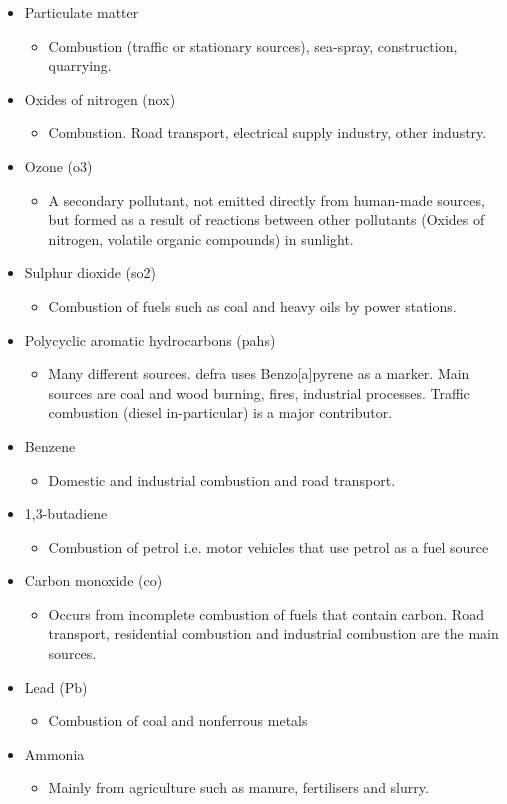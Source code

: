 \begin{itemize}
\item Particulate matter
\begin{itemize}
\item Combustion (traffic or stationary sources), sea-spray, construction, quarrying.
\end{itemize}
\item Oxides of nitrogen (\gls{nox})
\begin{itemize}
\item Combustion. Road transport, electrical supply industry, other industry.
\end{itemize}
\item Ozone (\gls{o3})
\begin{itemize}
\item A secondary pollutant, not emitted directly from human-made sources, but formed as a result of reactions between other pollutants (Oxides of nitrogen, volatile organic compounds) in sunlight.
\end{itemize}
\item Sulphur dioxide (\gls{so2})
\begin{itemize}
\item Combustion of fuels such as coal and heavy oils by power stations.
\end{itemize}
\item Polycyclic aromatic hydrocarbons (\gls{pahs}) 
\begin{itemize}
\item Many different sources. \gls{defra} uses Benzo[a]pyrene as a marker. Main sources are coal and wood burning, fires, industrial processes. Traffic combustion (diesel in-particular) is a major contributor.
\end{itemize}
\item Benzene
\begin{itemize}
\item Domestic and industrial combustion and road transport.
\end{itemize}
\item 1,3-butadiene
\begin{itemize}
\item Combustion of petrol i.e. motor vehicles that use petrol as a fuel source
\end{itemize}
\item Carbon monoxide (\gls{co})
\begin{itemize}
\item Occurs from incomplete combustion of fuels that contain carbon. Road transport, residential combustion and industrial combustion are the main sources.
\end{itemize}
\item Lead (Pb)
\begin{itemize}
\item Combustion of coal and nonferrous metals
\end{itemize}
\item Ammonia
\begin{itemize}
\item Mainly from agriculture such as manure, fertilisers and slurry.
\end{itemize}
\end{itemize}

